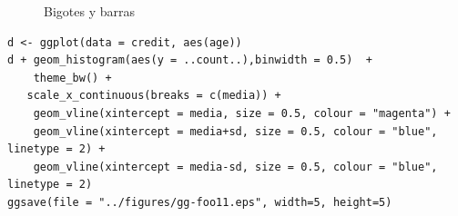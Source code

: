 \begin{figure}[h]
 \begin{center}
 \hspace{0.1cm}
 \hspace{0.1cm}
 \caption{Bigotes y barras}
 \label{fig:barras}
 \end{center}
\end{figure}

\begin{verbatim}
d <- ggplot(data = credit, aes(age)) 
d + geom_histogram(aes(y = ..count..),binwidth = 0.5)  + 
    theme_bw() + 
   scale_x_continuous(breaks = c(media)) + 
    geom_vline(xintercept = media, size = 0.5, colour = "magenta") +
    geom_vline(xintercept = media+sd, size = 0.5, colour = "blue", linetype = 2) +
    geom_vline(xintercept = media-sd, size = 0.5, colour = "blue", linetype = 2) 
ggsave(file = "../figures/gg-foo11.eps", width=5, height=5)
\end{verbatim}

